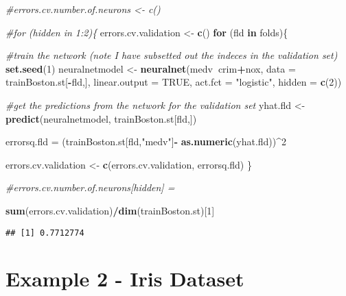 \documentclass[
]{book}
\newenvironment{Shaded}{\begin{snugshade}}{\end{snugshade}}
\newcommand{\CommentTok}[1]{\textcolor[rgb]{0.56,0.35,0.01}{\textit{#1}}}
\newcommand{\ControlFlowTok}[1]{\textcolor[rgb]{0.13,0.29,0.53}{\textbf{#1}}}
\newcommand{\DataTypeTok}[1]{\textcolor[rgb]{0.13,0.29,0.53}{#1}}
\newcommand{\DecValTok}[1]{\textcolor[rgb]{0.00,0.00,0.81}{#1}}
\newcommand{\KeywordTok}[1]{\textcolor[rgb]{0.13,0.29,0.53}{\textbf{#1}}}
\newcommand{\NormalTok}[1]{#1}
\newcommand{\OperatorTok}[1]{\textcolor[rgb]{0.81,0.36,0.00}{\textbf{#1}}}
\newcommand{\OtherTok}[1]{\textcolor[rgb]{0.56,0.35,0.01}{#1}}
\newcommand{\StringTok}[1]{\textcolor[rgb]{0.31,0.60,0.02}{#1}}
\begin{document}
\begin{Shaded}
\begin{Highlighting}[]
\CommentTok{#errors.cv.number.of.neurons <- c()}

\CommentTok{#for (hidden in 1:2)\{}
\NormalTok{errors.cv.validation <-}\StringTok{ }\KeywordTok{c}\NormalTok{()}
\ControlFlowTok{for}\NormalTok{ (fld }\ControlFlowTok{in}\NormalTok{ folds)\{}
  
  \CommentTok{#train the network (note I have subsetted out the indeces in the validation set)}
  \KeywordTok{set.seed}\NormalTok{(}\DecValTok{1}\NormalTok{)}
\NormalTok{  neuralnetmodel <-}\StringTok{ }\KeywordTok{neuralnet}\NormalTok{(medv}\OperatorTok{~}\NormalTok{crim}\OperatorTok{+}\NormalTok{nox, }\DataTypeTok{data =}\NormalTok{ trainBoston.st[}\OperatorTok{-}\NormalTok{fld,], }
                  \DataTypeTok{linear.output =} \OtherTok{TRUE}\NormalTok{, }
                  \DataTypeTok{act.fct =} \StringTok{"logistic"}\NormalTok{,}
                  \DataTypeTok{hidden =} \KeywordTok{c}\NormalTok{(}\DecValTok{2}\NormalTok{))}
  
  \CommentTok{#get the predictions from the network for the validation set}
\NormalTok{  yhat.fld <-}\StringTok{ }\KeywordTok{predict}\NormalTok{(neuralnetmodel, trainBoston.st[fld,])}
  
\NormalTok{  errorsq.fld =}\StringTok{ }\NormalTok{(trainBoston.st[fld,}\StringTok{"medv"}\NormalTok{]}\OperatorTok{-}
\StringTok{                                                }\KeywordTok{as.numeric}\NormalTok{(yhat.fld))}\OperatorTok{^}\DecValTok{2}
  
\NormalTok{  errors.cv.validation <-}\StringTok{ }\KeywordTok{c}\NormalTok{(errors.cv.validation, errorsq.fld)}
\NormalTok{\} }

\CommentTok{#errors.cv.number.of.neurons[hidden] = }

\KeywordTok{sum}\NormalTok{(errors.cv.validation)}\OperatorTok{/}\KeywordTok{dim}\NormalTok{(trainBoston.st)[}\DecValTok{1}\NormalTok{]}
\end{Highlighting}
\end{Shaded}

\begin{verbatim}
## [1] 0.7712774
\end{verbatim}

\hypertarget{example-2---iris-dataset}{%
\section{Example 2 - Iris Dataset}\label{example-2---iris-dataset}}
\end{document}
